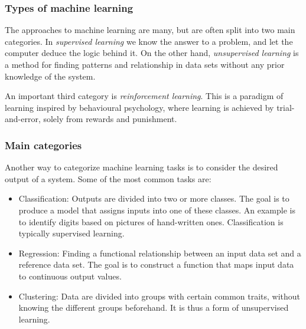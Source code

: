 \documentclass{beamer}
\begin{document}
\begin{frame}
\frametitle{Types of machine learning}

\begin{block}{}
The approaches to machine learning are many, but are often split into two main categories. 
In \emph{supervised learning} we know the answer to a problem,
and let the computer deduce the logic behind it. On the other hand, \emph{unsupervised learning}
is a method for finding patterns and relationship in data sets without any prior knowledge of the system.

An important  third category is  \emph{reinforcement learning}. This is a paradigm 
of learning inspired by behavioural psychology, where learning is achieved by trial-and-error, 
solely from rewards and punishment.
\end{block}
\end{frame}

\begin{frame}
\frametitle{Main categories}

\begin{block}{}
Another way to categorize machine learning tasks is to consider the desired output of a system.
Some of the most common tasks are:

\begin{itemize}
  \item Classification: Outputs are divided into two or more classes. The goal is to   produce a model that assigns inputs into one of these classes. An example is to identify  digits based on pictures of hand-written ones. Classification is typically supervised learning.

  \item Regression: Finding a functional relationship between an input data set and a reference data set.   The goal is to construct a function that maps input data to continuous output values.

  \item Clustering: Data are divided into groups with certain common traits, without knowing the different groups beforehand.  It is thus a form of unsupervised learning.
\end{itemize}

\noindent
\end{block}
\end{frame}
\end{document}
